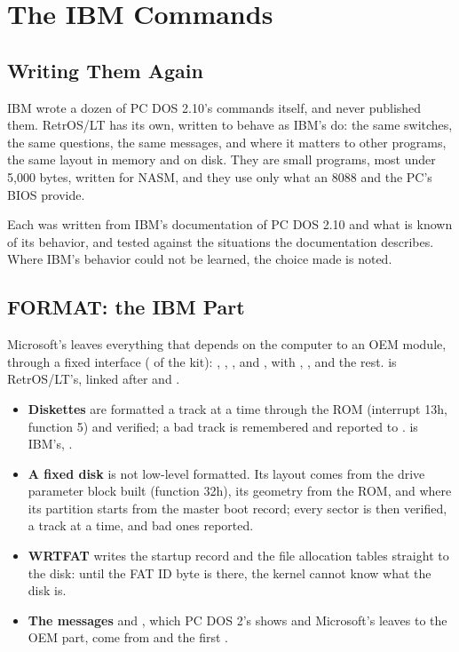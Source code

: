 \mwnewpart
\renewcommand\runningtitle{Section 5. The IBM Commands}
\chapter{The IBM Commands}
\sectioncontents

\section{Writing Them Again}

\begin{plainwords}
IBM wrote a dozen of PC DOS 2.10's commands itself, and never published
them. RetrOS/LT has its own, written to behave as IBM's do: the same
switches, the same questions, the same messages, and where it matters to
other programs, the same layout in memory and on disk. They are small
programs, most under 5,000 bytes, written for NASM, and they use only
what an 8088 and the PC's BIOS provide.
\end{plainwords}

Each was written from IBM's documentation of PC DOS 2.10 and what is
known of its behavior, and tested against the situations the
documentation describes. Where IBM's behavior could not be learned, the
choice made is noted.

\section{FORMAT: the IBM Part}

Microsoft's  leaves everything that depends on the computer
to an OEM module, through a fixed interface ( of the
kit): , , ,
 and , with ,
,  and the rest.  is
RetrOS/LT's, linked after  and .

\begin{itemize}
\item \textbf{Diskettes} are formatted a track at a time through the ROM
  (interrupt 13h, function 5) and verified; a bad track is remembered and
  reported to .  is IBM's,
  .
\item \textbf{A fixed disk} is not low-level formatted. Its layout comes
  from the drive parameter block  built (function 32h),
  its geometry from the ROM, and where its partition starts from the
  master boot record; every sector is then verified, a track at a time,
  and bad ones reported.
\item \textbf{WRTFAT} writes the startup record and the file allocation
  tables straight to the disk: until the FAT ID byte is there, the kernel
  cannot know what the disk is.
\item \textbf{The messages}  and , which PC DOS 2's  shows and Microsoft's leaves to
  the OEM part, come from  and the first
  .
\end{itemize}

